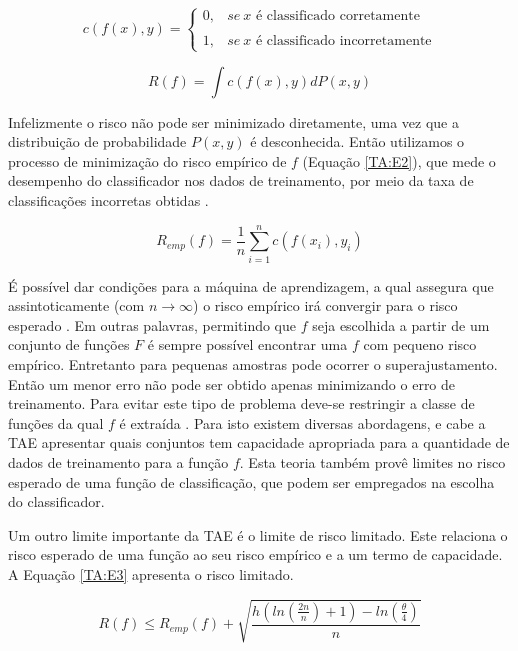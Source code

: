 \begin{equation} \label{funcx}
c(f(x),y) = \left\{\begin{matrix}
0, & se\ x \text{ é classificado corretamente} \\ 
														       \\		
1, & se\ x \text{ é classificado incorretamente}
\end{matrix}\right.
\end{equation}

\begin{equation} \label{TA:E1}
R(f) = \int c(f(x),y)dP(x,y)
\end{equation}

Infelizmente o risco não pode ser minimizado diretamente, uma vez que a distribuição de probabilidade $P(x,y)$ é desconhecida. Então utilizamos o processo de minimização do risco empírico de $f$ (Equação \ref{TA:E2}), que mede o desempenho do classificador nos dados de treinamento, por meio da taxa de classificações incorretas obtidas \cite{Muller2001}.

\begin{equation} \label{TA:E2}
R_{emp}(f) = \frac{1}{n} \sum_{i=1}^n c(f(x_{i}),y_{i})
\end{equation}

É possível dar condições para a máquina de aprendizagem, a qual assegura que assintoticamente (com $n \rightarrow \infty$) o risco empírico irá convergir para o risco esperado \cite{Muller2001}. Em outras palavras, permitindo que $f$ seja escolhida a partir de um conjunto de funções $F$ é sempre possível encontrar uma $f$ com pequeno risco empírico. Entretanto para pequenas amostras pode ocorrer o superajustamento. Então um menor erro não pode ser obtido apenas minimizando o erro de treinamento. Para evitar este tipo de problema deve-se restringir a classe de funções da qual $f$ é extraída \cite{Scholkopf2002}. Para isto existem diversas abordagens, e cabe a TAE apresentar quais conjuntos tem capacidade apropriada para a quantidade de dados de treinamento para a função $f$. Esta teoria também provê limites no risco esperado de uma função de classificação, que podem ser empregados na escolha do classificador.

Um outro limite importante da TAE é o limite de risco limitado. Este relaciona o risco esperado de uma função ao seu risco empírico e a um termo de capacidade. A Equação \ref{TA:E3} apresenta o risco limitado.

\begin{equation} \label{TA:E3}
R(f)\leq R_{emp}(f)+\sqrt{\frac{h\left(ln(\frac{2n}{n})+1\right) - ln (\frac{\theta}{4})}{n}}
\end{equation}

